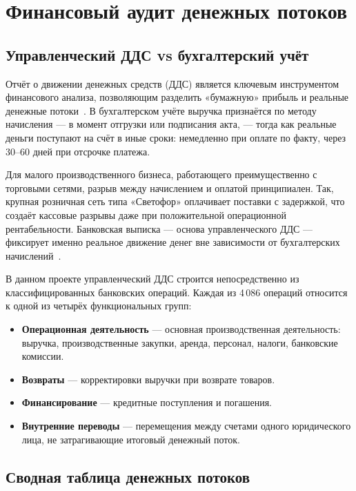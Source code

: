 \chapter{Финансовый аудит денежных потоков}

\section{Управленческий ДДС vs бухгалтерский учёт}

Отчёт о движении денежных средств (ДДС) является ключевым инструментом финансового анализа, позволяющим разделить «бумажную» прибыль и реальные денежные потоки~\cite{ias7}. В бухгалтерском учёте выручка признаётся по методу начисления --- в момент отгрузки или подписания акта, --- тогда как реальные деньги поступают на счёт в иные сроки: немедленно при оплате по факту, через 30--60 дней при отсрочке платежа.

Для малого производственного бизнеса, работающего преимущественно с торговыми сетями, разрыв между начислением и оплатой принципиален. Так, крупная розничная сеть типа «Светофор» оплачивает поставки с задержкой, что создаёт кассовые разрывы даже при положительной операционной рентабельности. Банковская выписка --- основа управленческого ДДС --- фиксирует именно реальное движение денег вне зависимости от бухгалтерских начислений~\cite{penman2013financial}.

В данном проекте управленческий ДДС строится непосредственно из классифицированных банковских операций. Каждая из 4\,086 операций относится к одной из четырёх функциональных групп:
\begin{itemize}
  \item \textbf{Операционная деятельность} --- основная производственная деятельность: выручка, производственные закупки, аренда, персонал, налоги, банковские комиссии.
  \item \textbf{Возвраты} --- корректировки выручки при возврате товаров.
  \item \textbf{Финансирование} --- кредитные поступления и погашения.
  \item \textbf{Внутренние переводы} --- перемещения между счетами одного юридического лица, не затрагивающие итоговый денежный поток.
\end{itemize}

\section{Сводная таблица денежных потоков}


